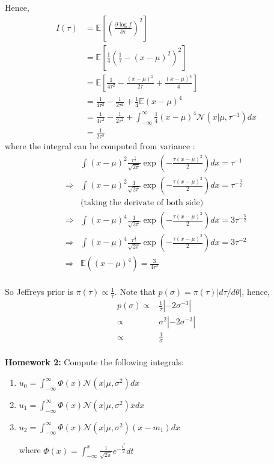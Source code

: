 \documentclass[11pt]{article}
\def\MN{{\mathcal N}}
\def\BE{{\mathbb E}}
\begin{document}
\begin{description}
Hence, 
\[\begin{split}
I(\tau) &= \BE\left[\left( \frac{\partial \log f}{\partial \tau} \right)^2\right]  \\
&= \BE\left[ \frac{1}{4} \left( \frac{1}{\tau} - (x-\mu)^2 \right)^2  \right] \\
&= \BE\left[ \frac{1}{4\tau^2} - \frac{(x - \mu)^2}{2\tau} + \frac{(x-\mu)^4}{4} \right] \\
&= \frac{1}{4\tau^2} - \frac{1}{2\tau^2} + \frac{1}{4}\BE(x-\mu)^4 \\
&= \frac{1}{4\tau^2}-\frac{1}{2\tau^2} + \int^\infty_{-\infty} \frac{1}{4}(x - \mu)^4\MN(x|\mu, \tau^{-1})dx \\
&= \frac{1}{2\tau^2}
\end{split}\]
where the integral can be computed from variance :
\[\begin{split}
& \int (x-\mu)^2\frac{\tau^{\frac{1}{2}}}{\sqrt{2\pi}}\exp(-\frac{\tau(x-\mu)^2}{2})dx =  \tau^{-1} \\
\Longrightarrow & \int (x-\mu)^2\frac{1}{\sqrt{2\pi}}\exp(-\frac{\tau(x-\mu)^2}{2})dx =  \tau^{-\frac{3}{2}} \\ 
& \mbox{(taking the derivate of both side)} \\
\Longrightarrow & \int (x-\mu)^4\frac{1}{\sqrt{2\pi}}\exp(-\frac{\tau(x-\mu)^2}{2})dx =  3\tau^{-\frac{5}{2}} \\ 
\Longrightarrow & \int (x-\mu)^4\frac{\tau^{\frac{1}{2}}}{\sqrt{2\pi}}\exp(-\frac{\tau(x-\mu)^2}{2})dx =  3\tau^{-2} \\ 
\Longrightarrow & \BE\left((x-\mu)^4\right) = \frac{3}{4\tau^2} \\
\end{split}\]

So Jeffreys prior is $\pi(\tau) \propto\frac{1}{\tau}$.
Note that $p(\sigma)=\pi(\tau)|d\tau/d\theta|$, hence, 
\begin{eqnarray*}
p(\sigma)
\propto &\frac{1}{\tau}|-2\sigma^{-3}|\\
\propto & \sigma^2|-2\sigma^{-3}| \\
\propto & \frac{1}{\sigma} \\
\end{eqnarray*}
\end{description}
\textbf{Homework 2:} Compute the following integrals:
\begin{enumerate}
\item $u_0 = \int_{-\infty}^{\infty} \Phi(x) \MN(x|\mu, \sigma^2) dx$
\item $u_1 = \int_{-\infty}^{\infty} \Phi(x) \MN(x|\mu, \sigma^2)x dx$
\item $u_2 = \int_{-\infty}^{\infty} \Phi(x) \MN(x|\mu, \sigma^2)(x-m_1) dx$

where $\Phi(x) = \int_{-\infty}^{x} \frac{1}{\sqrt{2\pi}} e^{-\frac{t^2}{2}} dt$
\end{enumerate}
\end{document}
